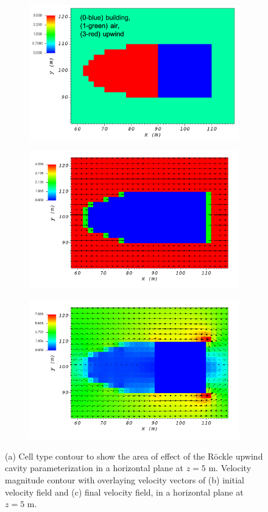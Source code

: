 \begin{figure}[H]
    \centering
    \begin{subfigure}{\textwidth}
    \centering
    \includegraphics[width=10.3cm,keepaspectratio]{Images/upwind_z_5_1_init_icell.png}
    \caption{}
    \end{subfigure}
    \begin{subfigure}{\textwidth}
    \centering
    \includegraphics[width=11.0cm,keepaspectratio]{Images/upwind_z_5_1_init_vel.png}
    \caption{}
    \end{subfigure}
    \begin{subfigure}{\textwidth}
    \centering
    \includegraphics[width=11.0cm,keepaspectratio]{Images/upwind_z_5_1_final.png}
    \caption{}
    \end{subfigure}
    \caption{(a) Cell type contour to show the area of effect of the R\"{o}ckle upwind cavity parameterization in a horizontal plane at $z=5$ m. Velocity magnitude contour with overlaying velocity vectors of (b) initial velocity field and (c) final velocity field, in a horizontal plane at $z=5$ m.}
\end{figure}

